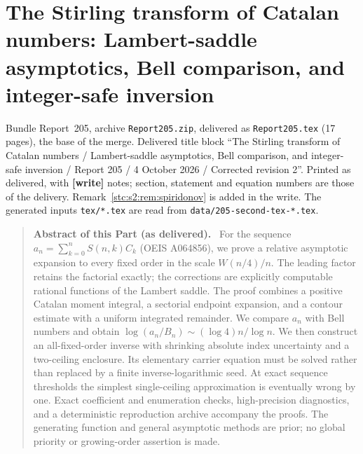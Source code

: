 \documentclass[11pt,letterpaper]{article}
\numberwithin{equation}{section}
\theoremstyle{remark}\newtheorem{remark}[theorem]{Remark}
\newcommand{\file}[1]{\nolinkurl{#1}}
\newenvironment{partabstract}{\begin{quote}\small\noindent\textbf{Abstract of this Part (as delivered).}\ }{\end{quote}}
\newcommand{\partsource}[1]{\par\noindent\begin{minipage}{\textwidth}\small #1\end{minipage}\par\medskip}
\begin{document}
\part{The Stirling transform of Catalan numbers: Lambert-saddle asymptotics, Bell comparison, and integer-safe inversion}\label{stc:s2:part}
\partsource{Bundle Report~205, archive \file{Report205.zip}, delivered as \file{Report205.tex} (17 pages), the base of the merge. Delivered title block ``The Stirling transform of Catalan numbers / Lambert-saddle asymptotics, Bell comparison, and integer-safe inversion / Report 205 / 4 October 2026 / Corrected revision 2''. Printed as delivered, with \textbf{[write]} notes; section, statement and equation numbers are those of the delivery. Remark~\ref{stc:s2:rem:spiridonov} is added in the write. The generated inputs \file{tex/*.tex} are read from \file{data/205-second-tex-*.tex}.}
\begin{partabstract}
For the sequence $a_n=\sum_{k=0}^n S(n,k)C_k$ (OEIS A064856), we prove a relative asymptotic expansion to every fixed order in the scale $W(n/4)/n$. The leading factor retains the factorial exactly; the corrections are explicitly computable rational functions of the Lambert saddle. The proof combines a positive Catalan moment integral, a sectorial endpoint expansion, and a contour estimate with a uniform integrated remainder. We compare $a_n$ with Bell numbers and obtain $\log(a_n/B_n)\sim(\log4)n/\log n$. We then construct an all-fixed-order inverse with shrinking absolute index uncertainty and a two-ceiling enclosure. Its elementary carrier equation must be solved rather than replaced by a finite inverse-logarithmic seed. At exact sequence thresholds the simplest single-ceiling approximation is eventually wrong by one. Exact coefficient and enumeration checks, high-precision diagnostics, and a deterministic reproduction archive accompany the proofs. The generating function and general asymptotic methods are prior; no global priority or growing-order assertion is made.
\end{partabstract}
\end{document}
